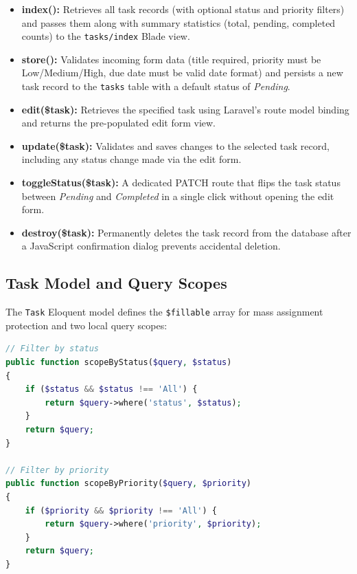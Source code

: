 \documentclass[12pt,a4paper]{report}
\begin{document}
\begin{itemize}[leftmargin=1.5cm]
    \item \textbf{index():} Retrieves all task records (with optional status and priority
    filters) and passes them along with summary statistics (total, pending, completed
    counts) to the \texttt{tasks/index} Blade view.

    \item \textbf{store():} Validates incoming form data (title required, priority must
    be Low/Medium/High, due date must be valid date format) and persists a new task
    record to the \texttt{tasks} table with a default status of \textit{Pending}.

    \item \textbf{edit(\$task):} Retrieves the specified task using Laravel's route model
    binding and returns the pre-populated edit form view.

    \item \textbf{update(\$task):} Validates and saves changes to the selected task
    record, including any status change made via the edit form.

    \item \textbf{toggleStatus(\$task):} A dedicated PATCH route that flips the task
    status between \textit{Pending} and \textit{Completed} in a single click without
    opening the edit form.

    \item \textbf{destroy(\$task):} Permanently deletes the task record from the
    database after a JavaScript confirmation dialog prevents accidental deletion.
\end{itemize}

\subsection{Task Model and Query Scopes}

The \texttt{Task} Eloquent model defines the \texttt{\$fillable} array for mass
assignment protection and two local query scopes:

\begin{lstlisting}[language=PHP, caption={Task Model Scopes}]
// Filter by status
public function scopeByStatus($query, $status)
{
    if ($status && $status !== 'All') {
        return $query->where('status', $status);
    }
    return $query;
}

// Filter by priority
public function scopeByPriority($query, $priority)
{
    if ($priority && $priority !== 'All') {
        return $query->where('priority', $priority);
    }
    return $query;
}
\end{lstlisting}
\end{document}
